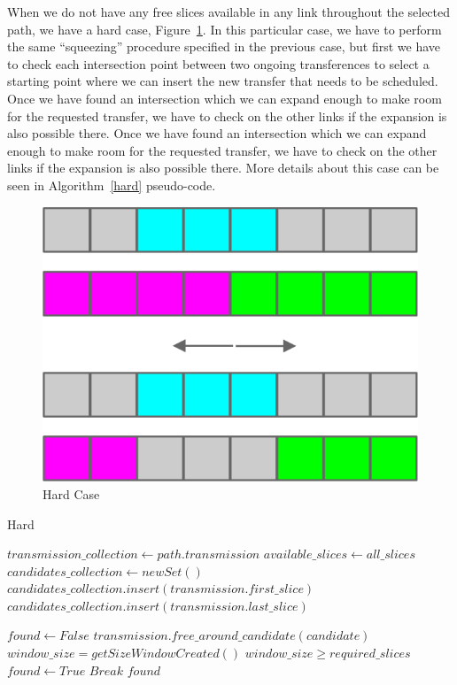 \documentclass[11pt,a4paper]{article}
\begin{document}
When we do not have any free slices available in any link throughout the selected path, we have a hard case, Figure~\ref{fig:hardcase}. In this particular case, we have to perform the same ``squeezing'' procedure specified in the previous case, but first we have to check each intersection point between two ongoing transferences to select a starting point where we can insert the new transfer that needs to be scheduled. Once we have found an intersection which we can expand enough to make room for the requested transfer, we have to check on the other links if the expansion is also possible there. Once we have found an intersection which we can expand enough to make room for the requested transfer, we have to check on the other links if the expansion is also possible there. More details about this case can be seen in Algorithm~\ref{hard} pseudo-code.\\

\begin{figure}[H]
  \centering
    \includegraphics[scale=1]{hardcase.jpg}
  \caption{Hard Case}
  \label{fig:hardcase}
\end{figure}

\begin{algorithm}[H]
\caption{Hard}\label{hard}
\begin{algorithmic}[1]
	\State $transmission\_collection\gets path.transmission$
	\State $available\_slices\gets all\_slices$
	\State $candidates\_collection\gets new Set()$
      \State $candidates\_collection.insert(transmission.first\_slice)$
      \State $candidates\_collection.insert(transmission.last\_slice)$
	\EndFor
	
	\State $found \gets False$
			\State $transmission.free\_around\_candidate(candidate)$
		\EndFor
		\State $window\_size=getSizeWindowCreated()$
		\If $window\_size \geq required\_slices$
			\State $found \gets True$
			\State $Break$
		\EndIf
	\EndFor
	\State \Return $found$
\EndProcedure
\end{algorithmic}
\end{algorithm}
\end{document}
